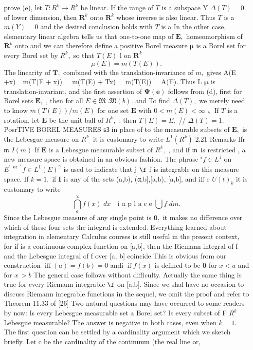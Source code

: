 prove (e), let $T\colon R^{k}\to R^{k}$ be linear. If the range of ${\mathbf{}}T$ is a subspace Y $\Delta(T)=0.$ of lower dimension, then ${\boldsymbol{R}}^{k}$ onto ${\boldsymbol{R}}^{k}$ whose inverse is also linear. Thus ${\mathbf{}}T$ is a $m(Y)=0$ and the desired conclusion holds with ${\mathbf{}}T$ is a In the other case, elementary linear algebra tells us that one-to-one map of ${\boldsymbol{E}},$ homeomorphism of ${\boldsymbol{R}}^{k}$ onto and we can therefore define a positive Borel measure ${\boldsymbol{\mu}}$ is a Borel set for every Borel set by $R^{k},$ so that $\scriptstyle T(E)$ l on ${\boldsymbol{R}}^{k}$ $$ \mu(E)=m(T(E)). $$ The linearity of ${\boldsymbol{T}},$ combined with the translation-invariance of $m,$ gives A(E +x)= m(T(E + x)) = m(T(E) + Tx) = m(T(E)) = A(E). Thus L ${\boldsymbol{\mu}}$ is translation-invariant, and the first assertion of $\mathbf{\Psi}({\boldsymbol{e}})$ follows from (d), first for Borel sets ${\boldsymbol{E}},$ , then for all $E\in\mathfrak{M}\ .{\mathfrak{M}}\left(b\right).$ and To find $\Delta(T),$ we merely need to know $m(T(E))/m(E)$ for one set $\boldsymbol{E}$ with $0<m(E)<\infty$ 、If ${\mathbf{}}T$ is a rotation, let $\boldsymbol{E}$ be the unit ball of $R^{k},$ ; then $T(E)=E,$ // $\Delta(T)=1.$PosrTIVE BOREL MEASURES ${\mathsf{s3}}$ in place of to the measurable subsets of ${\boldsymbol{E}},$ is the Lebesgue measure on $R^{k}{}_{;}$ it is customary to write $L^{1}(R^{k})$ 2.21 Remarks Ifr ${\mathfrak{m}}$ $\scriptstyle I(m)$ If $\boldsymbol{E}$ is a Lebesgue measurable subset of $R^{k},$ , and if ${\mathfrak{m}}\,$ is restricted , a new measure space is obtained in an obvious fashion. The phrase ${}^{\circ}f\in L^{1}$ on $E^{'\;\;\mathrm{or}\;\;^{\mathrm{*}{}}}f\in L^{1}(E)^{\gamma}$ is used to indicate that j $\boldsymbol{\f}$ f is integrable on this measure space. If $k=1,$ if ${\mathbf I}$ is any of the sets (a,b), (α,b],[a,b), [a,b], and iff e $\scriptstyle U(t)_{k}$ it is customary to write $$ \bigcap_{a}^{\prime b}f(x)\;d x\quad{\textrm{i n p l a c e}}\;\bigcup_{}f\;d m. $$ Since the Lebesgue measure of any single point is ${\boldsymbol{0}},$ it makes no difference over which of these four sets the integral is extended. Everything learned about integration in elementary Calculus courses is still useful in the present context, for if is a continuous complex function on [a,b], then the Riemann integral of f and the Lebesgue integral of f over [a, b] coincide This is obvious from our construction $\operatorname{iff}(a)=f(b)=0$ andi $\operatorname{if}f(x)$ is defined to be $\mathbf{0}$ for $x<a$ and for $\scriptstyle x\,>b$ The general case follows without difficulty. Actually the same thing is true for every Riemann integrable $\boldsymbol{\f}$ on [a,b]. Since we shal have no occasion to discuss Riemann integrable functions in the sequel, we omit the proof and refer to Theorem 11.33 of [26] Two natural questions may have occurred to some readers by now: Is every Lebesgue measurable set a Borel set? Is every subset of F $R^{k}$ Lebesgue measurable? The answer is negative in both cases, even when $k=1.$ The first question can be settled by a cardinality argument which we sketch briefly. Let c be the cardinality of the continuum (the real line or, 